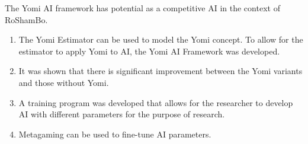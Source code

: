 The Yomi AI framework has potential as a competitive AI in the context of RoShamBo. 

\begin{enumerate}[label=\arabic*.]
\item The Yomi Estimator can be used to model the Yomi concept. To allow for the estimator to apply Yomi to AI, the Yomi AI Framework was developed.

\item It was shown that there is significant improvement between the Yomi variants and those without Yomi.

\item A training program was developed that allows for the researcher to develop AI with different parameters for the purpose of research.

\item Metagaming can be used to fine-tune AI parameters.
\end{enumerate}